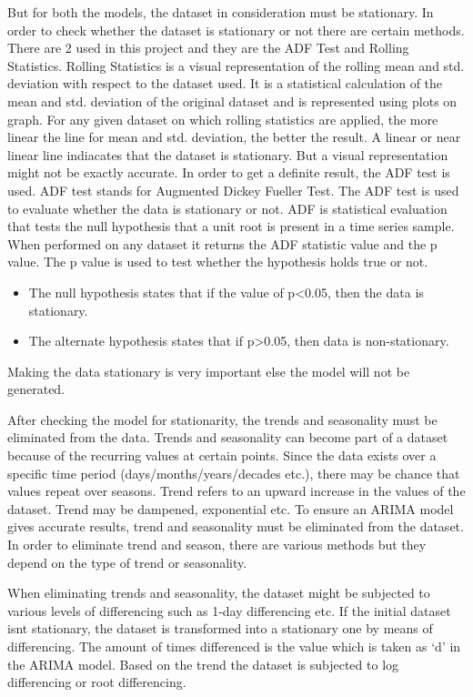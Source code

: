 \documentclass[BTech]{srmuthesis}
\begin{document}
But for both the models, the dataset in consideration must be stationary. In order to check whether the dataset is stationary or not there are certain methods. There are 2 used in this project and they are the ADF Test and Rolling Statistics. 
Rolling Statistics is a visual representation of the rolling mean and std. deviation with respect to the dataset used. It is a statistical calculation of the mean and std. deviation of the original dataset and is represented using plots on graph. For any given dataset on which rolling statistics are applied, the more linear the line for mean and std. deviation, the better the result. A linear or near linear line indiacates that the dataset is stationary. But a visual representation might not be exactly accurate. In order to get a definite result, the ADF test is used. ADF test stands for Augmented Dickey Fueller Test. The ADF test is used to evaluate whether the data is stationary or not. ADF is statistical evaluation that tests the null hypothesis that a unit root is present in a time series sample. When performed on any dataset it returns the ADF statistic value and the p value. The p value is used to test whether the hypothesis holds true or not.


\begin{itemize}
	\item The null hypothesis states that if the value of p<0.05, then the data is stationary. 
	\item The alternate hypothesis states that if p>0.05, then data is non-stationary.
\end{itemize}

Making the data stationary is very important else the model will not be generated.

After checking the model for stationarity, the trends and seasonality must be eliminated from the data. Trends and seasonality can become part of a dataset because of the recurring values at certain points. Since the data exists over a specific time period (days/months/years/decades etc.), there may be chance that values repeat over seasons. Trend refers to an upward increase in the values of the dataset. Trend may be dampened, exponential etc. To ensure an ARIMA model gives accurate results, trend and seasonality must be eliminated from the dataset. In order to eliminate trend and season, there are various methods but they depend on the type of trend or seasonality. 

When eliminating trends and seasonality, the dataset might be subjected to various levels of differencing such as 1-day differencing etc. If the initial dataset isn\textquotesingle t stationary, the dataset is transformed into a stationary one by means of differencing. The amount of times differenced is the value which is taken as `d' in the ARIMA model. Based on the trend the dataset is subjected to log differencing or root differencing. 
\end{document}
